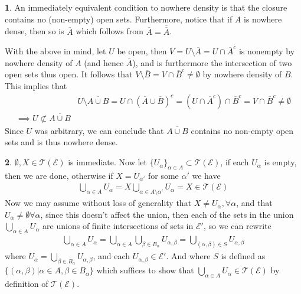 \documentclass[10.5pt]{article}
\theoremstyle{definition}
\newtheorem{pb}{}
\newcommand{\set}[1]{\{#1\}}
\begin{document}
    \begin{pb}
        An immediately equivalent condition to nowhere density is that the closure contains no (non-empty) open sets. Furthermore, notice that if \(A\) is nowhere dense, then so is \(\overline{A}\) which follows from \(\overline{A} = \overline{\overline{A}}\).

        With the above in mind, let \(U\) be open, then \(V = U \setminus \overline{A} = U \cap \overline{A}^c\) is nonempty by nowhere density of \(A\) (and hence \(\overline{A}\)), and is furthermore the intersection of two open sets thus open. It follows that \(V \setminus \overline{B} = V \cap \overline{B}^c \neq \emptyset\) by nowhere density of \(B\). This implies that
        \begin{align*}
            &U \setminus \overline{A\cup B} = U \cap (\overline{A}\cup \overline{B})^c = (U \cap \overline{A}^c) \cap \overline{B}^c = V \cap \overline{B}^c \neq \emptyset \\
            \implies U \not \subset \overline{A\cup B}
        \end{align*}
        Since \(U\) was arbitrary, we can conclude that \(\overline{A\cup B}\) contains no non-empty open sets and is thus nowhere dense.
    \end{pb}
    \begin{pb}
        \(\emptyset, X \in \mathcal{T}(\mathcal{E})\) is immediate. Now let \(\set{U_\alpha}_{\alpha\in A} \subset \mathcal{T}(\mathcal{E})\), if each \(U_\alpha\) is empty, then we are done, otherwise if \(X = U_{\alpha'}\) for some \(\alpha'\) we have 
        \begin{align*}
            \bigcup_{\alpha \in A}U_\alpha = X \bigcup_{\alpha \in A \setminus \alpha'} U_\alpha = X \in \mathcal{T}(\mathcal{E})
        \end{align*}
        Now we may assume without loss of generality that \(X \neq U_\alpha, \forall \alpha\), and that \(U_\alpha \neq \emptyset \forall \alpha\), since this doesn't affect the union, then
        each of the sets in the union \(\bigcup_{\alpha\in A}U_\alpha\) are unions of finite intersections of sets in \(\mathcal{E}'\), so we can rewrite
        \begin{align*}
            \bigcup_{\alpha \in A}U_\alpha = \bigcup_{\alpha \in A} \bigcup_{\beta \in B_\alpha} U_{\alpha,\beta} = \bigcup_{(\alpha,\beta) \in S} U_{\alpha,\beta}
        \end{align*}
        where \(U_\alpha = \bigcup_{\beta \in B_\alpha} U_{\alpha,\beta}\), and each \(U_{\alpha,\beta} \in \mathcal{E}'\). And where \(S\) is defined as \(\set{(\alpha,\beta) \vert \alpha \in A, \beta \in B_\alpha}\) which suffices to show that \(\bigcup_{\alpha \in A} U_\alpha \in \mathcal{T}(\mathcal{E})\) by definition of \(\mathcal{T}(\mathcal{E})\).
    \end{pb}
\end{document}
